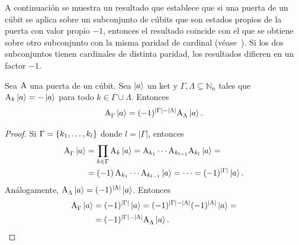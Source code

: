 A continuación se muestra un resultado que establece que si una puerta de un cúbit se aplica sobre un subconjunto de cúbits que son estados propios de la puerta con valor propio $-1$, entonces el resultado coincide con el que se obtiene sobre otro subconjunto con la misma paridad de cardinal (véase~\cite{NielsenChuang}). Si los dos subconjuntos tienen cardinales de distinta paridad, los resultados difieren en un factor $-1$.
\begin{proposition}
  Sea $\text{A}$ una puerta de un cúbit. Sea $\ket{a}$ un ket y $\Gamma, \Lambda \subseteq \mathbb{N}_n$ tales que $\text{A}_{k}\ket{a} = -\ket{a}$ para todo $k \in \Gamma \cup \Lambda$. Entonces
  \begin{equation}
    \text{A}^{}_{\Gamma}\ket{a} = (-1)^{|\Gamma|-|\Lambda|}\text{A}^{}_{\Lambda}\ket{a}.
  \end{equation}
\end{proposition}
\begin{proof}
  Si $\Gamma=\{k_1,\dots,k_l\}$ donde $l=|\Gamma|$, entonces
  \begin{align*}
    \text{A}^{}_{\Gamma}\ket{a} & = \prod_{k \in \Gamma} \text{A}_k\ket{a} = \text{A}_{k_1}\cdots\text{A}_{k_{l-1}}\text{A}_{k_l}\ket{a} = \\
                                   & = (-1)\,\text{A}_{k_1}\cdots\text{A}_{k_{l-1}}\ket{a} =\dots = (-1)^{|\Gamma|} \ket{a}.
  \end{align*}
  Análogamente, $\text{A}^{}_{\Lambda}\ket{a} = (-1)^{|\Lambda|} \ket{a}$.
  Entonces
  \begin{align*}
    \text{A}^{}_{\Gamma}\ket{a} & = (-1)^{|\Gamma|} \ket{a} = (-1)^{|\Gamma|-|\Lambda|}(-1)^{|\Lambda|} \ket{a}= \\
                                   & =(-1)^{|\Gamma|-|\Lambda|}\text{A}^{}_{\Lambda}\ket{a}.
  \end{align*}
\end{proof}
